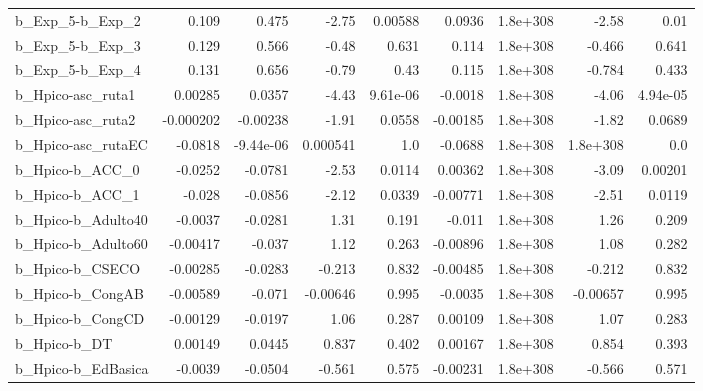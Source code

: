 \begin{tabular}{lrrrrrrrr}
b\_Exp\_5-b\_Exp\_2              &       0.109 &        0.475 &     -2.75 &  0.00588 &     0.0936 &    1.8e+308 &        -2.58 &          0.01 \\
b\_Exp\_5-b\_Exp\_3              &       0.129 &        0.566 &     -0.48 &    0.631 &      0.114 &    1.8e+308 &       -0.466 &         0.641 \\
b\_Exp\_5-b\_Exp\_4              &       0.131 &        0.656 &     -0.79 &     0.43 &      0.115 &    1.8e+308 &       -0.784 &         0.433 \\
b\_Hpico-asc\_ruta1            &     0.00285 &       0.0357 &     -4.43 & 9.61e-06 &    -0.0018 &    1.8e+308 &        -4.06 &      4.94e-05 \\
b\_Hpico-asc\_ruta2            &   -0.000202 &     -0.00238 &     -1.91 &   0.0558 &   -0.00185 &    1.8e+308 &        -1.82 &        0.0689 \\
b\_Hpico-asc\_rutaEC           &     -0.0818 &    -9.44e-06 &  0.000541 &      1.0 &    -0.0688 &    1.8e+308 &     1.8e+308 &           0.0 \\
b\_Hpico-b\_ACC\_0              &     -0.0252 &      -0.0781 &     -2.53 &   0.0114 &    0.00362 &    1.8e+308 &        -3.09 &       0.00201 \\
b\_Hpico-b\_ACC\_1              &      -0.028 &      -0.0856 &     -2.12 &   0.0339 &   -0.00771 &    1.8e+308 &        -2.51 &        0.0119 \\
b\_Hpico-b\_Adulto40           &     -0.0037 &      -0.0281 &      1.31 &    0.191 &     -0.011 &    1.8e+308 &         1.26 &         0.209 \\
b\_Hpico-b\_Adulto60           &    -0.00417 &       -0.037 &      1.12 &    0.263 &   -0.00896 &    1.8e+308 &         1.08 &         0.282 \\
b\_Hpico-b\_CSECO              &    -0.00285 &      -0.0283 &    -0.213 &    0.832 &   -0.00485 &    1.8e+308 &       -0.212 &         0.832 \\
b\_Hpico-b\_CongAB             &    -0.00589 &       -0.071 &  -0.00646 &    0.995 &    -0.0035 &    1.8e+308 &     -0.00657 &         0.995 \\
b\_Hpico-b\_CongCD             &    -0.00129 &      -0.0197 &      1.06 &    0.287 &    0.00109 &    1.8e+308 &         1.07 &         0.283 \\
b\_Hpico-b\_DT                 &     0.00149 &       0.0445 &     0.837 &    0.402 &    0.00167 &    1.8e+308 &        0.854 &         0.393 \\
b\_Hpico-b\_EdBasica           &     -0.0039 &      -0.0504 &    -0.561 &    0.575 &   -0.00231 &    1.8e+308 &       -0.566 &         0.571 \\

\end{tabular}
